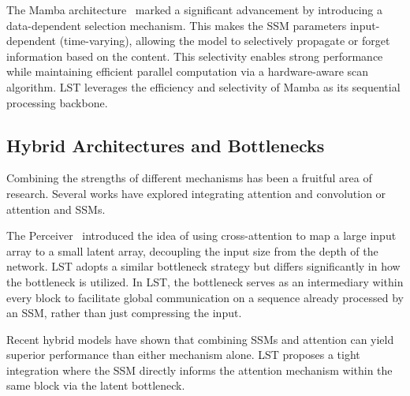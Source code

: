 \documentclass[10pt,twocolumn,letterpaper]{article}
\begin{document}
The Mamba architecture~\cite{gu2023mamba} marked a significant advancement by introducing a data-dependent selection mechanism. This makes the SSM parameters input-dependent (time-varying), allowing the model to selectively propagate or forget information based on the content. This selectivity enables strong performance while maintaining efficient parallel computation via a hardware-aware scan algorithm. LST leverages the efficiency and selectivity of Mamba as its sequential processing backbone.

\subsection{Hybrid Architectures and Bottlenecks}

Combining the strengths of different mechanisms has been a fruitful area of research. Several works have explored integrating attention and convolution or attention and SSMs.

The Perceiver~\cite{jaegle2021perceiver} introduced the idea of using cross-attention to map a large input array to a small latent array, decoupling the input size from the depth of the network. LST adopts a similar bottleneck strategy but differs significantly in how the bottleneck is utilized. In LST, the bottleneck serves as an intermediary within every block to facilitate global communication on a sequence already processed by an SSM, rather than just compressing the input.

Recent hybrid models have shown that combining SSMs and attention can yield superior performance than either mechanism alone. LST proposes a tight integration where the SSM directly informs the attention mechanism within the same block via the latent bottleneck.
\end{document}
